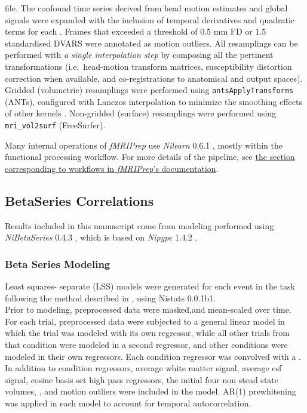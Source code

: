 \documentclass[10pt,letterpaper]{article}
\begin{document}
\begin{description}
file. The confound time series derived from head motion estimates and
global signals were expanded with the inclusion of temporal derivatives
and quadratic terms for each \cite{confounds_satterthwaite_2013}.
Frames that exceeded a threshold of 0.5 mm FD or 1.5 standardised DVARS
were annotated as motion outliers. All resamplings can be performed with
\emph{a single interpolation step} by composing all the pertinent
transformations (i.e.~head-motion transform matrices, susceptibility
distortion correction when available, and co-registrations to anatomical
and output spaces). Gridded (volumetric) resamplings were performed
using \texttt{antsApplyTransforms} (ANTs), configured with Lanczos
interpolation to minimize the smoothing effects of other kernels
\cite{lanczos}. Non-gridded (surface) resamplings were performed using
\texttt{mri\_vol2surf} (FreeSurfer).
\end{description}

Many internal operations of \emph{fMRIPrep} use \emph{Nilearn} 0.6.1
\cite[RRID:SCR\_001362]{nilearn}, mostly within the functional
processing workflow. For more details of the pipeline, see
\href{https://fmriprep.readthedocs.io/en/latest/workflows.html}{the
section corresponding to workflows in \emph{fMRIPrep}'s documentation}.

\subsection{BetaSeries Correlations}

Results included in this manuscript come from modeling performed using
\emph{NiBetaSeries} 0.4.3 \cite{Kent2018}, which is based on
\emph{Nipype} 1.4.2 \cite{Gorgolewski2011, Gorgolewski2018}.

\hypertarget{beta-series-modeling}{%
\subsubsection{Beta Series Modeling}\label{beta-series-modeling}}

Least squares- separate (LSS) models were generated for each event in
the task following the method described in \cite{Turner2012a}, using
Nistats 0.0.1b1.\\
Prior to modeling, preprocessed data were masked,and mean-scaled over
time. For each trial, preprocessed data were subjected to a general
linear model in which the trial was modeled with its own regressor, while
all other trials from that condition were modeled in a second regressor,
and other conditions were modeled in their own regressors. Each
condition regressor was convolved with a \cite[glover hemodynamic response
function]{Glover1999}.\\
In addition to condition regressors, average white matter signal, average csf signal,
cosine basis set high pass regressors, the initial four non stead state volumes,
\cite[friston 24]{Friston1996}, and motion outliers were included
in the model. AR(1) prewhitening was applied in each model to account
for temporal autocorrelation.
\end{document}

